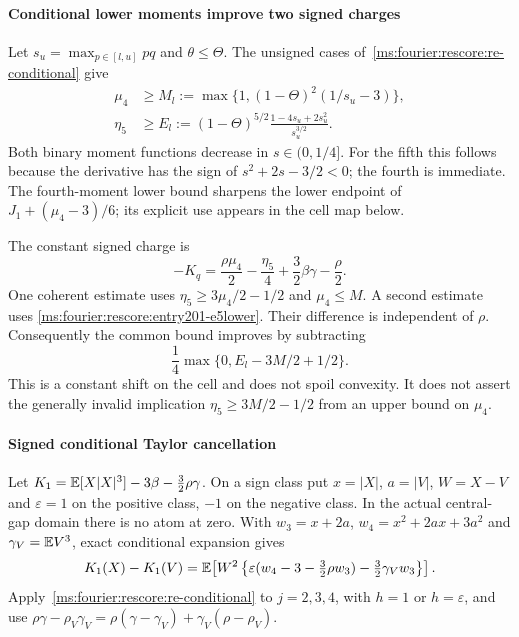 \paragraph{Conditional lower moments improve two signed charges}

Let $s_u=\max_{p\in[l,u]}pq$ and $\theta\le\Theta$.
The unsigned cases of~\eqref{ms:fourier:rescore:re-conditional} give
\begin{align}
 \mu_4&\ge M_l:=\max\{1,(1-\Theta)^2(1/s_u-3)\},\label{ms:fourier:rescore:entry201-m4lower}\\
 \eta_5&\ge E_l:=
 (1-\Theta)^{5/2}\frac{1-4s_u+2s_u^2}{s_u^{3/2}}.\label{ms:fourier:rescore:entry201-e5lower}
\end{align}
Both binary moment functions decrease in $s\in(0,1/4]$.
For the fifth this follows because the derivative has the sign of
$s^2+2s-3/2<0$; the fourth is immediate.
The fourth-moment lower bound sharpens the lower endpoint of
$J_1+(\mu_4-3)/6$; its explicit use appears in the cell map below.

The constant signed charge is
\[
 -K_q=\frac{\rho\mu_4}{2}-\frac{\eta_5}{4}
       +\frac32\beta\gamma-\frac{\rho}{2}.
\]
One coherent estimate uses $\eta_5\ge3\mu_4/2-1/2$ and
$\mu_4\le M$. A second estimate uses \eqref{ms:fourier:rescore:entry201-e5lower}.
Their difference is independent of $\rho$. Consequently the common
bound improves by subtracting
\begin{equation}\label{ms:fourier:rescore:entry201-eta-improvement}
 \frac14\max\{0,E_l-3M/2+1/2\}.
\end{equation}
This is a constant shift on the cell and does not spoil convexity.
It does not assert the generally invalid implication
$\eta_5\ge3M/2-1/2$ from an upper bound on $\mu_4$.

\paragraph{Signed conditional Taylor cancellation}

Let $K_1=\mathbb E[X|X|^3]-3\beta-\tfrac32\rho\gamma$.
On a sign class put $x=|X|$, $a=|V|$, $W=X-V$ and
$\varepsilon=1$ on the positive class, $-1$ on the negative class.
In the actual central-gap domain there is no atom at zero.
With $w_3=x+2a$, $w_4=x^2+2ax+3a^2$ and
$\gamma_V=\mathbb E V^3$, exact conditional expansion gives
\begin{equation}\label{ms:fourier:rescore:entry201-Kexact}
 K_1(X)-K_1(V)
 =\mathbb E\!\left[W^2
 \left\{\varepsilon(w_4-3-\tfrac32\rho w_3)
                   -\tfrac32\gamma_Vw_3\right\}\right].
\end{equation}
Apply~\eqref{ms:fourier:rescore:re-conditional} to $j=2,3,4$, with $h=1$
or $h=\varepsilon$, and use
$\rho\gamma-\rho_V\gamma_V
=\rho(\gamma-\gamma_V)+\gamma_V(\rho-\rho_V)$.

